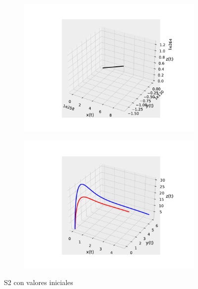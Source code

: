 \documentclass{wscpaperproc}
\theoremstyle{wsc}
\begin{document}
\begin{figure}[h]
	\centering
	\begin{subfigure}[b]{0.5\textwidth}
		\centering
		\includegraphics[width=\textwidth]{Simulations/S53d.pdf}
	
		\label{fig:comparativa91}
	\end{subfigure}%
	\begin{subfigure}[b]{0.5\textwidth}
		\centering
		\includegraphics[width=\textwidth]{Simulations/S13d.pdf}
		\label{fig:comparativa92}
	\end{subfigure}
	\caption{S2 con valores iniciales}

	\label{fig:comparacion16}
\end{figure}
\end{document}
